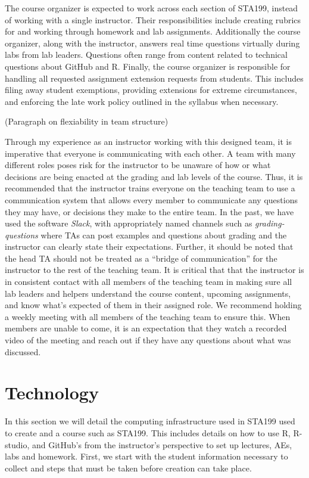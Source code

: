 \documentclass[
  12pt]{article}
\begin{document}
The course organizer is expected to work across each section of STA199,
instead of working with a single instructor. Their responsibilities
include creating rubrics for and working through homework and lab
assignments. Additionally the course organizer, along with the
instructor, answers real time questions virtually during labs from lab
leaders. Questions often range from content related to technical
questions about GitHub and R. Finally, the course organizer is
responsible for handling all requested assignment extension requests
from students. This includes filing away student exemptions, providing
extensions for extreme circumstances, and enforcing the late work policy
outlined in the syllabus when necessary.

(Paragraph on flexiability in team structure)

Through my experience as an instructor working with this designed team,
it is imperative that everyone is communicating with each other. A team
with many different roles poses risk for the instructor to be unaware of
how or what decisions are being enacted at the grading and lab levels of
the course. Thus, it is recommended that the instructor trains everyone
on the teaching team to use a communication system that allows every
member to communicate any questions they may have, or decisions they
make to the entire team. In the past, we have used the software
\emph{Slack}, with appropriately named channels such as
\emph{grading-questions} where TAs can post examples and questions about
grading and the instructor can clearly state their expectations.
Further, it should be noted that the head TA should not be treated as a
``bridge of communication'' for the instructor to the rest of the
teaching team. It is critical that that the instructor is in consistent
contact with all members of the teaching team in making sure all lab
leaders and helpers understand the course content, upcoming assignments,
and know what's expected of them in their assigned role. We recommend
holding a weekly meeting with all members of the teaching team to ensure
this. When members are unable to come, it is an expectation that they
watch a recorded video of the meeting and reach out if they have any
questions about what was discussed.

\hypertarget{sec-tech}{%
\section{Technology}\label{sec-tech}}

In this section we will detail the computing infrastructure used in
STA199 used to create and a course such as STA199. This includes details
on how to use R, R-studio, and GitHub's from the instructor's
perspective to set up lectures, AEs, labs and homework. First, we start
with the student information necessary to collect and steps that must be
taken before creation can take place.
\end{document}
